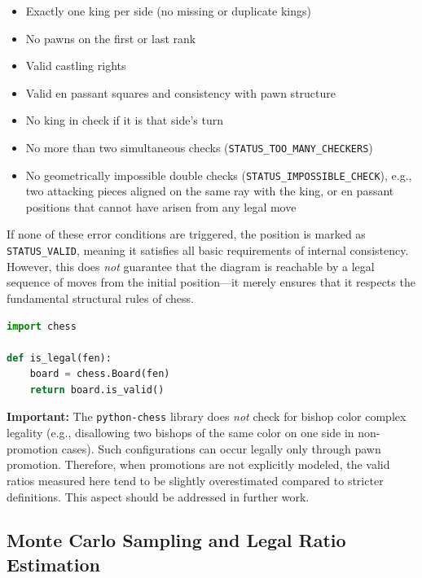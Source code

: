 \documentclass[12pt]{article}
\begin{document}
\begin{itemize}
    \item Exactly one king per side (no missing or duplicate kings)
    \item No pawns on the first or last rank
    \item Valid castling rights
    \item Valid en passant squares and consistency with pawn structure
    \item No king in check if it is that side’s turn
    \item No more than two simultaneous checks (\texttt{STATUS\_TOO\_MANY\_CHECKERS})
    \item No geometrically impossible double checks (\texttt{STATUS\_IMPOSSIBLE\_CHECK}), 
          e.g., two attacking pieces aligned on the same ray with the king,
          or en passant positions that cannot have arisen from any legal move
\end{itemize}

\noindent
If none of these error conditions are triggered, the position is marked as 
\texttt{STATUS\_VALID}, meaning it satisfies all basic requirements of internal consistency.
However, this does \emph{not} guarantee that the diagram is reachable by a legal sequence of moves from the initial position---it merely ensures that it respects the fundamental structural rules of chess.

\begin{lstlisting}[language=Python, caption={Validation of chess positions using python-chess}, label={lst:is_legal}]
import chess

def is_legal(fen):
    board = chess.Board(fen)
    return board.is_valid()
\end{lstlisting}

\noindent
\textbf{Important:} The \texttt{python-chess} library does \emph{not} check for bishop color complex legality 
(e.g., disallowing two bishops of the same color on one side in non-promotion cases). 
Such configurations can occur legally only through pawn promotion. 
Therefore, when promotions are not explicitly modeled, the valid ratios measured here 
tend to be slightly overestimated compared to stricter definitions. 
This aspect should be addressed in further work.

\subsection{Monte Carlo Sampling and Legal Ratio Estimation}
\end{document}
